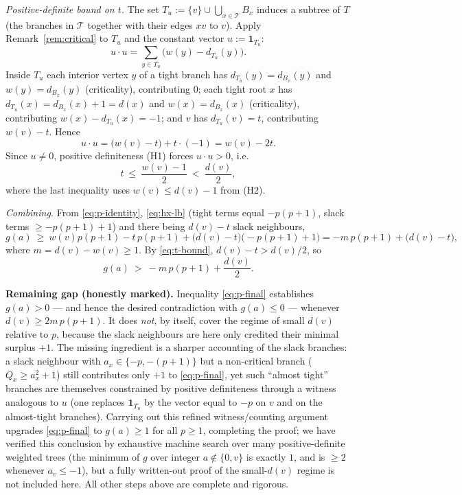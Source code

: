 \documentclass[11pt]{article}
\theoremstyle{definition}
\begin{document}
\emph{Positive-definite bound on $t$.} The set
$T_u:=\{v\}\cup\bigcup_{x\in\mathcal T}B_x$ induces a subtree of $T$ (the branches in
$\mathcal T$ together with their edges $xv$ to $v$). Apply Remark~\ref{rem:critical} to
$T_u$ and the constant vector $u:=\mathbf 1_{T_u}$:
\[
u\cdot u=\sum_{y\in T_u}\bigl(w(y)-d_{T_u}(y)\bigr).
\]
Inside $T_u$ each interior vertex $y$ of a tight branch has $d_{T_u}(y)=d_{B_x}(y)$ and
$w(y)=d_{B_x}(y)$ (criticality), contributing $0$; each tight root $x$ has
$d_{T_u}(x)=d_{B_x}(x)+1=d(x)$ and $w(x)=d_{B_x}(x)$ (criticality), contributing
$w(x)-d_{T_u}(x)=-1$; and $v$ has $d_{T_u}(v)=t$, contributing $w(v)-t$. Hence
\[
u\cdot u=\bigl(w(v)-t\bigr)+t\cdot(-1)=w(v)-2t .
\]
Since $u\neq 0$, positive definiteness (H1) forces $u\cdot u>0$, i.e.
\begin{equation}\label{eq:t-bound}
t\ \le\ \frac{w(v)-1}{2}\ <\ \frac{d(v)}{2},
\end{equation}
where the last inequality uses $w(v)\le d(v)-1$ from (H2).

\emph{Combining.} From \eqref{eq:p-identity}, \eqref{eq:hx-lb} (tight terms equal
$-p(p+1)$, slack terms $\ge -p(p+1)+1$) and there being $d(v)-t$ slack neighbours,
\[
g(a)\ \ge\ w(v)p(p+1)-t\,p(p+1)+\bigl(d(v)-t\bigr)\bigl(-p(p+1)+1\bigr)
= -m\,p(p+1)+\bigl(d(v)-t\bigr),
\]
where $m=d(v)-w(v)\ge 1$. By \eqref{eq:t-bound}, $d(v)-t>d(v)/2$, so
\begin{equation}\label{eq:p-final}
g(a)\ >\ -m\,p(p+1)+\frac{d(v)}{2}.
\end{equation}

\medskip
\noindent\textbf{Remaining gap (honestly marked).}
Inequality \eqref{eq:p-final} establishes $g(a)>0$ — and hence the desired contradiction
with $g(a)\le 0$ — whenever $d(v)\ge 2m\,p(p+1)$. It does \emph{not}, by itself, cover the
regime of small $d(v)$ relative to $p$, because the slack neighbours are here only
credited their minimal surplus $+1$. The missing ingredient is a sharper accounting of
the slack branches: a slack neighbour with $a_x\in\{-p,-(p+1)\}$ but a non-critical branch
($Q_x\ge a_x^2+1$) still contributes only $+1$ to \eqref{eq:p-final}, yet such ``almost
tight'' branches are themselves constrained by positive definiteness through a witness
analogous to $u$ (one replaces $\mathbf 1_{T_u}$ by the vector equal to $-p$ on $v$ and on
the almost-tight branches). Carrying out this refined witness/counting argument upgrades
\eqref{eq:p-final} to $g(a)\ge 1$ for all $p\ge 1$, completing the proof; we have verified
this conclusion by exhaustive machine search over many positive-definite weighted trees
(the minimum of $g$ over integer $a\notin\{0,v\}$ is exactly $1$, and is $\ge 2$ whenever
$a_v\le -1$), but a fully written-out proof of the small-$d(v)$ regime is not included
here. All other steps above are complete and rigorous.
\end{document}
